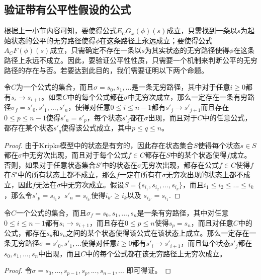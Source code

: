 \subsection{验证带有公平性假设的公式}
根据上一小节内容可知，要使得公式$E_CG_x(\phi)(s)$成立，只需找到一条以$s$为起始状态的公平的无穷路径使得$\phi$在这条路径上永远成立；要使得公式$A_CF(\phi)(s)$成立，只需确定不存在一条以$s$为其实状态的无穷路径使得$\phi$在这条路径上永远不成立。因此，要验证公平性性质，只需要一个机制来判断公平的无穷路径的存在与否。若要达到此目的，我们需要证明以下两个命题。



\begin{proposition}\label{prop:fair_if}
	令$C$为一个\CTLP{}公式的集合，而且$\sigma = s_0,s_1,...$是一条无穷路径，其中对于任意$i\ge 0$都有$s_i \rightarrow s_{i+1}$。如果$C$中的每个公式都在$\sigma$中无穷次成立，那么一定存在一条有穷路径$\sigma_f = s'_0,s'_1,...,s'_n$，使得对任意$0\le i\le n-1$都有$s'_j\rightarrow s'_{j+1}$而且存在$0\le p\le n-1$使得$s'_n = s'_p$，每个状态$s'_j$都在$\sigma$出现，而且对于$C$中的任意公式，都存在某个状态$s'_q$使得该公式成立，其中$p\le q\le n$。
\end{proposition}
\begin{proof}
	由于Kripke模型中的状态是有穷的，因此存在状态集合$S$使得每个状态$s\in S$都在$\sigma$中无穷次出现，而且对于每个公式$f\in C$都存在$S$中的某个状态使得$f$成立。否则，如果对于任意状态集合$S'$中的状态在$\sigma$无穷次出现，都存在公式$f\in C$使得$f$在$S'$中的所有状态上都不成立，那么$f$一定在所有在$\sigma$无穷次出现的状态上都不成立，因此$f$无法在$\sigma$中无穷次成立。假设$S = \{s_{i_1},s_{i_2},...,s_{i_k}\}$，而且$i_1\le i_2\le ...\le i_k$，那么令$s'_p = s_{i_1}$，$s'_n = s_{i_{k'}}$使得$i_{k'} \ge i_k$以及 $s_{i_{k'}} = s_{i_1}$.
\end{proof}

\begin{proposition}\label{prop:fair_fi}
	令$C$一个\CTLP{}公式的集合，而且$\sigma_f = s_0,s_1,...,s_n$是一条有穷路径，其中对任意$0\le i\le n-1$都有$s_i\rightarrow s_{i+1}$，而且存在$0\le p\le n$使得$s_p = s_n$，而且对任意$C$中的公式，都存在$s_p$和$s_n$之间的某个状态使得该公式在该状态上成立。那么一定存在一条无穷路径$\sigma = s'_0, s'_1,...$使得对任意$i\ge 0$都有$s'_i \rightarrow s'_{i+1}$，而且每个状态$s'_j$都在$s_0,s_1,...,s_n$中出现，而且$C$中的每个公式都在该无穷路径上无穷次成立。
\end{proposition}
\begin{proof}
	令$\sigma = s_0,...,s_{p-1},s_p,...,s_{n-1},...$ 
	即可得证。
\end{proof}


